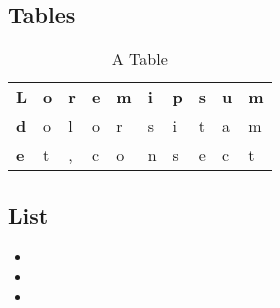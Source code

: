 \documentclass[12pt, a4paper]{article} %
\begin{document}
\subsection{Tables}


\begin{table}[H]
\centering
\caption{A Table}
\label{tab:tbl1}
\begin{tabular}{llllllllll}
\textbf{L}                      & \textbf{o}             & \textbf{r}             & \textbf{e}             & \textbf{m}             & \textbf{i}             & \textbf{p}             & \textbf{s}             & \textbf{u}             & \textbf{m}             \\ \cline{2-10} 
\multicolumn{1}{l|}{\textbf{d}} & \multicolumn{1}{l|}{o} & \multicolumn{1}{l|}{l} & \multicolumn{1}{l|}{o} & \multicolumn{1}{l|}{r} & \multicolumn{1}{l|}{s} & \multicolumn{1}{l|}{i} & \multicolumn{1}{l|}{t} & \multicolumn{1}{l|}{a} & \multicolumn{1}{l|}{m} \\ \cline{2-10} 
\multicolumn{1}{l|}{\textbf{e}} & \multicolumn{1}{l|}{t} & \multicolumn{1}{l|}{,} & \multicolumn{1}{l|}{c} & \multicolumn{1}{l|}{o} & \multicolumn{1}{l|}{n} & \multicolumn{1}{l|}{s} & \multicolumn{1}{l|}{e} & \multicolumn{1}{l|}{c} & \multicolumn{1}{l|}{t} \\ \cline{2-10} 
\end{tabular}
\end{table}


\subsection{List}

\begin{itemize}

\item

\item

\item


\end{itemize}
\end{document}
